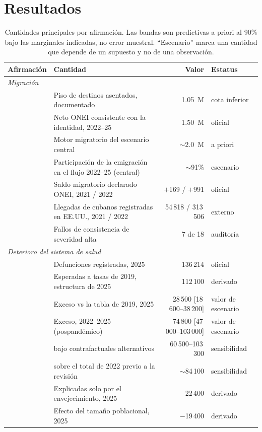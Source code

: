 \documentclass[11pt,a4paper]{article}
\begin{document}
\section{Resultados}

\begin{table}[ht]
\centering
\small
\caption{Cantidades principales por afirmación. Las bandas son predictivas a
priori al 90\% bajo las marginales indicadas, no error muestral. ``Escenario''
marca una cantidad que depende de un supuesto y no de una observación.}
\label{tab:headline}
\begin{tabular}{llrl}
\toprule
Afirmación & Cantidad & Valor & Estatus \\
\midrule
\multicolumn{4}{l}{\textit{Migración}} \\
& Piso de destinos asentados, documentado & 1.05~M & cota inferior \\
& Neto ONEI consistente con la identidad, 2022--25 & 1.50~M & oficial \\
& Motor migratorio del escenario central & $\sim$2.0~M & a priori \\
& Participación de la emigración en el flujo 2022--25 (central) & $\sim$91\% & escenario \\
& Saldo migratorio declarado ONEI, 2021 / 2022 & $+$169 / $+$991 & oficial \\
& Llegadas de cubanos registradas en EE.UU., 2021 / 2022 & 54\,818 / 313\,506 & externo \\
& Fallos de consistencia de severidad alta & 7 de 18 & auditoría \\
\midrule
\multicolumn{4}{l}{\textit{Deterioro del sistema de salud}} \\
& Defunciones registradas, 2025 & 136\,214 & oficial \\
& Esperadas a tasas de 2019, estructura de 2025 & 112\,100 & derivado \\
& Exceso vs la tabla de 2019, 2025 & 28\,500 [18\,600--38\,200] & valor de escenario \\
& Exceso, 2022--2025 (pospandémico) & 74\,800 [47\,000--103\,000] & valor de escenario \\
& \quad bajo contrafactuales alternativos & 60\,500--103\,300 & sensibilidad \\
& \quad sobre el total de 2022 previo a la revisión & $\sim$84\,100 & sensibilidad \\
& Explicadas solo por el envejecimiento, 2025 & 22\,400 & derivado \\
& Efecto del tamaño poblacional, 2025 & $-$19\,400 & derivado \\

\end{tabular}
\end{table}
\end{document}
